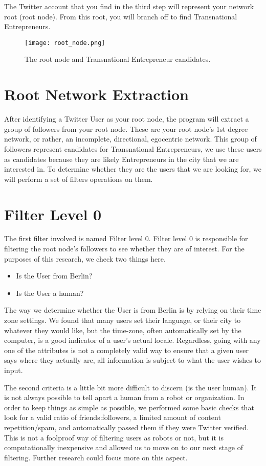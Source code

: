 The Twitter account that you find in the third step will represent
your network root (root node). From this root, you will branch off to
find Transnational Entrepreneurs.

\begin{figure}[H]
  \centering
  \texttt{[image: root\_node.png]}
  \caption{The root node and Transnational Entrepreneur candidates.}
\end{figure}

\section{Root Network Extraction}
After identifying a Twitter User as your root node, the program will
extract a group of followers from your root node. These are your root
node's 1st degree network, or rather, an incomplete, directional,
egocentric network. This group of followers represent candidates for
Transnational Entrepreneurs, we use these users as candidates because
they are likely Entrepreneurs in the city that we are interested in.
To determine whether they are the users that we are looking for, we
will perform a set of filters operations on them.

\section{Filter Level 0}
The first filter involved is named Filter level 0. Filter level 0 is
responsible for filtering the root node's followers to see whether
they are of interest. For the purposes of this research, we check two
things here.

\begin{itemize}
\item Is the User from Berlin?
\item Is the User a human?
\end{itemize}

The way we determine whether the User is from Berlin is by relying on
their time zone settings. We found that many users set their language,
or their city to whatever they would like, but the time-zone, often
automatically set by the computer, is a good indicator of a user's
actual locale. Regardless, going with any one of the attributes is not
a completely valid way to ensure that a given user says where they
actually are, all information is subject to what the user wishes to
input.

The second criteria is a little bit more difficult to discern (is the
user human). It is not always possible to tell apart a human from a
robot or organization. In order to keep things as simple as possible,
we performed some basic checks that look for a valid ratio of
friends:followers, a limited amount of content repetition/spam, and
automatically passed them if they were Twitter verified. This is not a
foolproof way of filtering users as robots or not, but it is
computationally inexpensive and allowed us to move on to our next
stage of filtering. Further research could focus more on this aspect.

